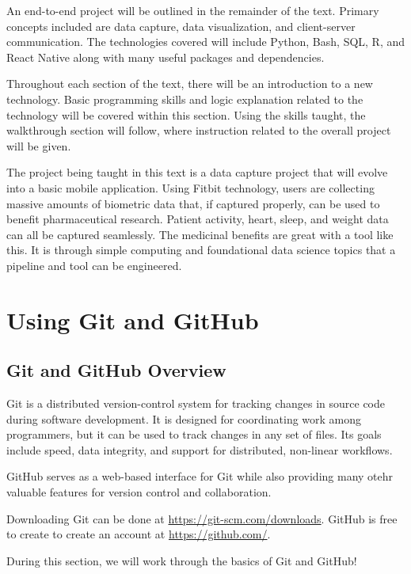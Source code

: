 \documentclass[]{book}
\begin{document}
An end-to-end project will be outlined in the remainder of the text.
Primary concepts included are data capture, data visualization, and
client-server communication. The technologies covered will include
Python, Bash, SQL, R, and React Native along with many useful packages
and dependencies.

Throughout each section of the text, there will be an introduction to a
new technology. Basic programming skills and logic explanation related
to the technology will be covered within this section. Using the skills
taught, the walkthrough section will follow, where instruction related
to the overall project will be given.

The project being taught in this text is a data capture project that
will evolve into a basic mobile application. Using Fitbit technology,
users are collecting massive amounts of biometric data that, if captured
properly, can be used to benefit pharmaceutical research. Patient
activity, heart, sleep, and weight data can all be captured seamlessly.
The medicinal benefits are great with a tool like this. It is through
simple computing and foundational data science topics that a pipeline
and tool can be engineered.

\chapter{Using Git and GitHub}\label{using-git-and-github}

\section{Git and GitHub Overview}\label{git-and-github-overview}

Git is a distributed version-control system for tracking changes in
source code during software development. It is designed for coordinating
work among programmers, but it can be used to track changes in any set
of files. Its goals include speed, data integrity, and support for
distributed, non-linear workflows.

GitHub serves as a web-based interface for Git while also providing many
otehr valuable features for version control and collaboration.

Downloading Git can be done at \url{https://git-scm.com/downloads}.
GitHub is free to create to create an account at
\url{https://github.com/}.

During this section, we will work through the basics of Git and GitHub!
\end{document}
